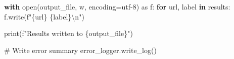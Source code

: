 \documentclass[
  titlepage]{article}
\newenvironment{Shaded}{\begin{snugshade}}{\end{snugshade}}
\newcommand{\BuiltInTok}[1]{\textcolor[rgb]{0.00,0.23,0.31}{#1}}
\newcommand{\CharTok}[1]{\textcolor[rgb]{0.13,0.47,0.30}{#1}}
\newcommand{\CommentTok}[1]{\textcolor[rgb]{0.37,0.37,0.37}{#1}}
\newcommand{\ControlFlowTok}[1]{\textcolor[rgb]{0.00,0.23,0.31}{\textbf{#1}}}
\newcommand{\ImportTok}[1]{\textcolor[rgb]{0.00,0.46,0.62}{#1}}
\newcommand{\KeywordTok}[1]{\textcolor[rgb]{0.00,0.23,0.31}{\textbf{#1}}}
\newcommand{\NormalTok}[1]{\textcolor[rgb]{0.00,0.23,0.31}{#1}}
\newcommand{\OperatorTok}[1]{\textcolor[rgb]{0.37,0.37,0.37}{#1}}
\newcommand{\SpecialCharTok}[1]{\textcolor[rgb]{0.37,0.37,0.37}{#1}}
\newcommand{\SpecialStringTok}[1]{\textcolor[rgb]{0.13,0.47,0.30}{#1}}
\newcommand{\StringTok}[1]{\textcolor[rgb]{0.13,0.47,0.30}{#1}}
\begin{document}
\begin{Shaded}
\begin{Highlighting}[]
    \ControlFlowTok{with} \BuiltInTok{open}\NormalTok{(output\_file, }\StringTok{\textquotesingle{}w\textquotesingle{}}\NormalTok{, encoding}\OperatorTok{=}\StringTok{\textquotesingle{}utf{-}8\textquotesingle{}}\NormalTok{) }\ImportTok{as}\NormalTok{ f:}
        \ControlFlowTok{for}\NormalTok{ url, label }\KeywordTok{in}\NormalTok{ results:}
\NormalTok{            f.write(}\SpecialStringTok{f"}\SpecialCharTok{\{}\NormalTok{url}\SpecialCharTok{\}}\SpecialStringTok{ }\SpecialCharTok{\{}\NormalTok{label}\SpecialCharTok{\}}\CharTok{\textbackslash{}n}\SpecialStringTok{"}\NormalTok{)}

    \BuiltInTok{print}\NormalTok{(}\SpecialStringTok{f"Results written to }\SpecialCharTok{\{}\NormalTok{output\_file}\SpecialCharTok{\}}\SpecialStringTok{"}\NormalTok{)}
    
    \CommentTok{\# Write error summary}
\NormalTok{    error\_logger.write\_log()}
\end{Highlighting}
\end{Shaded}
\end{document}
